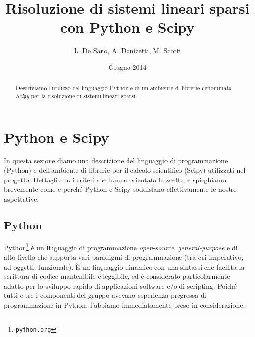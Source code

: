 \documentclass[11pt,a4paper]{scrartcl}
\author{L. De Sano, A. Donizetti, M. Scotti}
\title{Risoluzione di sistemi lineari sparsi\\con Python e Scipy}
\date{Giugno 2014}
\begin{document}
\maketitle
\begin{abstract}
Descriviamo l'utilizzo del linguaggio Python e di un ambiente di librerie denominato \emph{Scipy} per la risoluzione di sistemi lineari sparsi.
\end{abstract}

\section*{Python e Scipy}

In questa sezione diamo una descrizione del linguaggio di programmazione (Python) e dell'ambiente di librerie per il calcolo scientifico (Scipy) utilizzati nel progetto. Dettagliamo i criteri che hanno orientato la scelta, e spieghiamo brevemente come e perché Python e Scipy soddisfano effettivamente le nostre aspettative.

\subsection*{Python}

Python\footnote{\texttt{python.org}} è un linguaggio di programmazione \emph{open-source}, \emph{general-purpose} e di alto livello che supporta vari paradigmi di programmazione (tra cui imperativo, ad oggetti, funzionale). È un linguaggio dinamico con una sintassi che facilita la scrittura di codice mantenibile e leggibile, ed è considerato particolarmente adatto per lo sviluppo rapido di applicazioni software e/o di scripting. Poiché tutti e tre i componenti del gruppo avevano esperienza pregressa di programmazione in Python, l'abbiamo immediatamente preso in considerazione.
\end{document}

